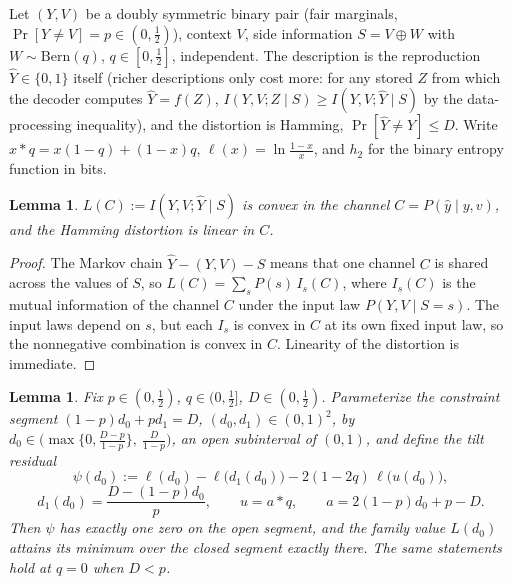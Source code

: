 \documentclass[11pt,onecolumn]{IEEEtran}
\newtheorem{lemma}[theorem]{Lemma}
\newcommand{\hY}{\widehat{Y}}
\begin{document}
Let $(Y,V)$ be a doubly symmetric binary pair (fair marginals,
$\Pr[Y\ne V]=p\in(0,\tfrac12)$), context $V$, side information
$S=V\oplus W$ with $W\sim\mathrm{Bern}(q)$, $q\in[0,\tfrac12]$,
independent. The description is the reproduction $\hY\in\{0,1\}$ itself
(richer descriptions only cost more: for any stored $Z$ from which the
decoder computes $\hY=f(Z)$, $I(Y,V;Z\mid S)\ge I(Y,V;\hY\mid S)$
by the data-processing inequality), and the distortion is Hamming,
$\Pr[\hY\ne Y]\le D$. Write $x*q=x(1-q)+(1-x)q$,
$\ell(x)=\ln\frac{1-x}{x}$, and $h_2$ for the binary entropy function
in bits.

\begin{lemma}\label{lem:binconvex}
$L(C):=I(Y,V;\hY\mid S)$ is convex in the channel
$C=P(\hat y\mid y,v)$, and the Hamming distortion is linear in $C$.
\end{lemma}

\begin{proof}
The Markov chain $\hY-(Y,V)-S$ means that one channel $C$ is shared
across the values of $S$, so $L(C)=\sum_sP(s)\,I_s(C)$, where $I_s(C)$
is the mutual information of the channel $C$ under the input law
$P(Y,V\mid S=s)$. The input laws depend on $s$, but each $I_s$ is
convex in $C$ at its own fixed input law, so the nonnegative
combination is convex in $C$. Linearity of the distortion is immediate.
\end{proof}

\begin{lemma}
\label{lem:tiltroot}
Fix $p\in(0,\tfrac12)$, $q\in(0,\tfrac12]$, $D\in(0,\tfrac12)$.
Parameterize the constraint segment $(1-p)d_0+pd_1=D$,
$(d_0,d_1)\in(0,1)^2$, by
$d_0\in\bigl(\max\{0,\tfrac{D-p}{1-p}\},\ \tfrac{D}{1-p}\bigr)$, an
open subinterval of $(0,1)$, and define the tilt residual
\[
\psi(d_0):=\ell(d_0)-\ell\bigl(d_1(d_0)\bigr)
-2(1-2q)\,\ell\bigl(u(d_0)\bigr),
\]
\[
d_1(d_0)=\frac{D-(1-p)d_0}{p},\qquad
u=a*q,\qquad a=2(1-p)d_0+p-D .
\]
Then $\psi$ has exactly one zero on the open segment, and the family
value $L(d_0)$ attains its minimum over the closed segment exactly
there. The same statements hold at $q=0$ when $D<p$.
\end{lemma}
\end{document}
